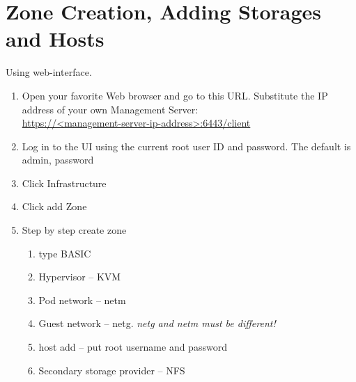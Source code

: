 \section{Zone Creation, Adding Storages and Hosts}

Using web-interface.
\begin{enumerate}
	\item Open your favorite Web browser and go to this URL.
		Substitute the IP address of your own Management Server:\\
		\url{https://<management-server-ip-address>:6443/client}
	\item Log in to the UI using the current root user ID and password. 
		The default is admin, password
	\item Click Infrastructure
	\item Click add Zone
	\item Step by step create zone
	\begin{enumerate}
		\item type BASIC
		\item Hypervisor -- KVM
		\item Pod network -- \acrfull{netm}
		\item Guest network -- \acrshort{netg}. 
			\emph{\acrshort{netg} and \acrshort{netm} must be different!}
		\item host add -- put root username and  password
		\item Secondary storage provider -- NFS
	\end{enumerate}
\end{enumerate}
